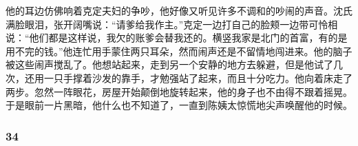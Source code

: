 \par 他的耳边仿佛响着克定夫妇的争吵，他好像又听见许多不调和的吵闹的声音。沈氏满脸眼泪，张开阔嘴说：“请爹给我作主。”克定一边打自己的脸颊一边带可怜相说：“他们都是这样说，我欠的账爹会替我还的。横竖我家是北门的首富，有的是用不完的钱。”他连忙用手蒙住两只耳朵，然而闹声还是不留情地闯进来。他的脑子被这些闹声搅乱了。他想站起来，走到另一个安静的地方去躲避，但是他试了几次，还用一只手撑着沙发的靠手，才勉强站了起来，而且十分吃力。他向着床走了两步。忽然一阵眼花，房屋开始颠倒地旋转起来，他的身子也不由得不跟着摇晃。于是眼前一片黑暗，他什么也不知道了，一直到陈姨太惊慌地尖声唤醒他的时候。



\subsubsection*{34}

